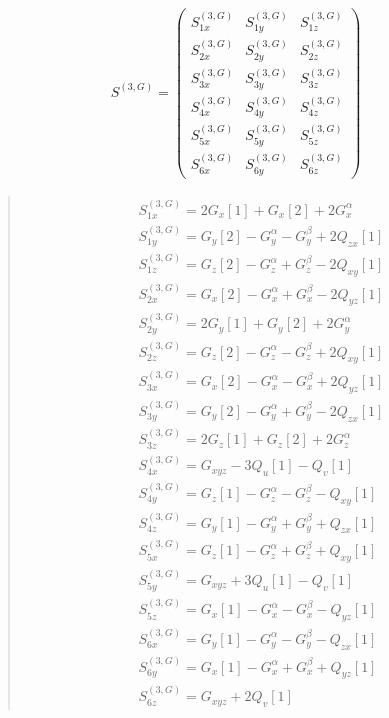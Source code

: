 \documentclass[fleqn,10pt]{jsarticle}
\begin{document}
\begin{align*}
S^{(3,G)} = \begin{pmatrix} S^{(3,G)}_{1x} & S^{(3,G)}_{1y} & S^{(3,G)}_{1z} \\ S^{(3,G)}_{2x} & S^{(3,G)}_{2y} & S^{(3,G)}_{2z} \\ S^{(3,G)}_{3x} & S^{(3,G)}_{3y} & S^{(3,G)}_{3z} \\ S^{(3,G)}_{4x} & S^{(3,G)}_{4y} & S^{(3,G)}_{4z} \\ S^{(3,G)}_{5x} & S^{(3,G)}_{5y} & S^{(3,G)}_{5z} \\ S^{(3,G)}_{6x} & S^{(3,G)}_{6y} & S^{(3,G)}_{6z} \end{pmatrix}
\end{align*}
\begin{quote}
\begin{align*}
& S^{(3,G)}_{1x} = 2 G_{x}[1] + G_{x}[2] + 2 G_{x}^{\alpha} \\
& S^{(3,G)}_{1y} = G_{y}[2] - G_{y}^{\alpha} - G_{y}^{\beta} + 2 Q_{zx}[1] \\
& S^{(3,G)}_{1z} = G_{z}[2] - G_{z}^{\alpha} + G_{z}^{\beta} - 2 Q_{xy}[1] \\
& S^{(3,G)}_{2x} = G_{x}[2] - G_{x}^{\alpha} + G_{x}^{\beta} - 2 Q_{yz}[1] \\
& S^{(3,G)}_{2y} = 2 G_{y}[1] + G_{y}[2] + 2 G_{y}^{\alpha} \\
& S^{(3,G)}_{2z} = G_{z}[2] - G_{z}^{\alpha} - G_{z}^{\beta} + 2 Q_{xy}[1] \\
& S^{(3,G)}_{3x} = G_{x}[2] - G_{x}^{\alpha} - G_{x}^{\beta} + 2 Q_{yz}[1] \\
& S^{(3,G)}_{3y} = G_{y}[2] - G_{y}^{\alpha} + G_{y}^{\beta} - 2 Q_{zx}[1] \\
& S^{(3,G)}_{3z} = 2 G_{z}[1] + G_{z}[2] + 2 G_{z}^{\alpha} \\
& S^{(3,G)}_{4x} = G_{xyz} - 3 Q_{u}[1] - Q_{v}[1] \\
& S^{(3,G)}_{4y} = G_{z}[1] - G_{z}^{\alpha} - G_{z}^{\beta} - Q_{xy}[1] \\
& S^{(3,G)}_{4z} = G_{y}[1] - G_{y}^{\alpha} + G_{y}^{\beta} + Q_{zx}[1] \\
& S^{(3,G)}_{5x} = G_{z}[1] - G_{z}^{\alpha} + G_{z}^{\beta} + Q_{xy}[1] \\
& S^{(3,G)}_{5y} = G_{xyz} + 3 Q_{u}[1] - Q_{v}[1] \\
& S^{(3,G)}_{5z} = G_{x}[1] - G_{x}^{\alpha} - G_{x}^{\beta} - Q_{yz}[1] \\
& S^{(3,G)}_{6x} = G_{y}[1] - G_{y}^{\alpha} - G_{y}^{\beta} - Q_{zx}[1] \\
& S^{(3,G)}_{6y} = G_{x}[1] - G_{x}^{\alpha} + G_{x}^{\beta} + Q_{yz}[1] \\
& S^{(3,G)}_{6z} = G_{xyz} + 2 Q_{v}[1]
\end{align*}
\end{quote}
\end{document}
